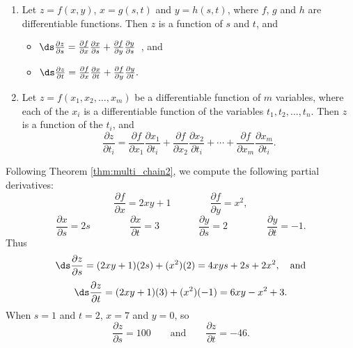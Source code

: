 {\begin{enumerate}
	\item Let $z=f(x,y)$, $x=g(s,t)$ and $y=h(s,t)$, where $f$, $g$ and $h$ are differentiable functions. Then $z$ is a function of $s$ and $t$, and
		\begin{itemize}
			\item $\ds \frac{\partial z}{\partial s} = \frac{\partial f}{\partial x}\frac{\partial x}{\partial s} + \frac{\partial f}{\partial y}\frac{\partial y}{\partial s}$\ , \quad and 
			\item $\ds \frac{\partial z}{\partial t} = \frac{\partial f}{\partial x}\frac{\partial x}{\partial t} + \frac{\partial f}{\partial y}\frac{\partial y}{\partial t}.$
		\end{itemize}
		
		\item		Let $z = f(x_1,x_2,\ldots,x_m)$ be a differentiable function of $m$ variables, where each of the $x_i$ is a differentiable function of the variables $t_1,t_2,\ldots,t_n$. Then $z$ is a function of the $t_i$, and 
		$$\frac{\partial z}{\partial t_i} = \frac{\partial f}{\partial x_1}\frac{\partial x_1}{\partial t_i} + \frac{\partial f}{\partial x_2}\frac{\partial x_2}{\partial t_i} + \cdots +  \frac{\partial f}{\partial x_m}\frac{\partial x_m}{\partial t_i}.$$
\end{enumerate}
}

{Following Theorem \ref{thm:multi_chain2}, we compute the following partial derivatives:
$$\frac{\partial f}{\partial x} = 2xy+1\qquad\qquad \frac{\partial f}{\partial y} = x^2,$$
$$\frac{\partial x}{\partial s} = 2s \qquad\qquad \frac{\partial x}{\partial t} = 3\qquad\qquad \frac{\partial y}{\partial s} = 2 \qquad\qquad \frac{\partial y}{\partial t} = -1.$$
Thus 
$$\ds \frac{\partial z}{\partial s} = (2xy+1)(2s) + (x^2)(2) = 4xys+2s + 2x^2,\quad \text{and}$$
$$\ds \frac{\partial z}{\partial t} = (2xy+1)(3) + (x^2)(-1) = 6xy-x^2+3.$$
When $s=1$ and $t=2$, $x= 7$ and $y= 0$, so 
$$\frac{\partial z}{\partial s} = 100\qquad \text{and}\qquad \frac{\partial z}{\partial t} = -46.$$
\baselineskip}\\

